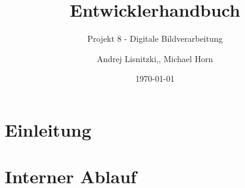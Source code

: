 						

\title{Entwicklerhandbuch}
\subtitle{Projekt 8 - Digitale Bildverarbeitung}

\author{Andrej Lisnitzki,, Michael Horn\vspace{4cm}}
\date{\today}

\maketitle

\section{Einleitung}
\section{Interner Ablauf}
